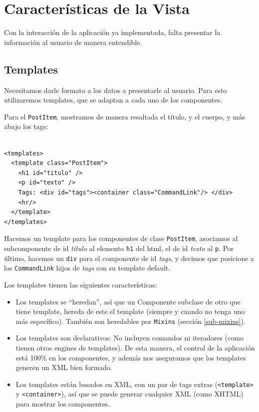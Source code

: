 \section{Características de la Vista}

Con la interacción de la aplicación ya implementada, falta presentar la información al usuario de manera entendible.

\label{sec-view}
\subsection{Templates}
\label{sub-templates}

Necesitamos darle formato a los datos a presentarle al usuario. Para esto utilizaremos templates, que se adaptan a cada uno de los componentes.

Para el \verb'PostItem', mostramos de manera resaltada el título, y el cuerpo, y más abajo los tags:

\begin{verbatim}

<templates>
  <template class="PostItem">
    <h1 id="titulo" />
    <p id="texto" />
    Tags: <div id="tags"><container class="CommandLink"/> </div>
    <hr/>
  </template>
</templates>

\end{verbatim}

Hacemos un template para los componentes de clase \verb'PostItem', asociamos al subcomponente de id \emph{titulo} al elemento \verb'h1' del html, el de id \emph{texto} al \verb'p'. Por último, hacemos un \verb'div' para el componente de id \emph{tags}, y decimos que posicione a los \verb'CommandLink' hijos de \emph{tags} con su template default.

Los templates tienen las siguientes características:
\begin{itemize}
\item Los templates se ``heredan'', así que un Componente subclase de otro que tiene template, hereda de este el template (siempre y cuando no tenga uno más específico). También son heredables por \verb"Mixins" (sección \ref{sub-mixins}).

\item Los templates son declarativos: No incluyen comandos ni iteradores (como tienen otros engines de templates). De esta manera, el control de la aplicación está 100\% en los componentes, y además nos aseguramos que los templates generen un XML bien formado.

\item Los templates están basados en XML, con un par de tags extras (\verb"<template>" y \verb"<container>"), así que se puede generar cualquier XML (como XHTML) para mostrar los componentes.
\end{itemize}

